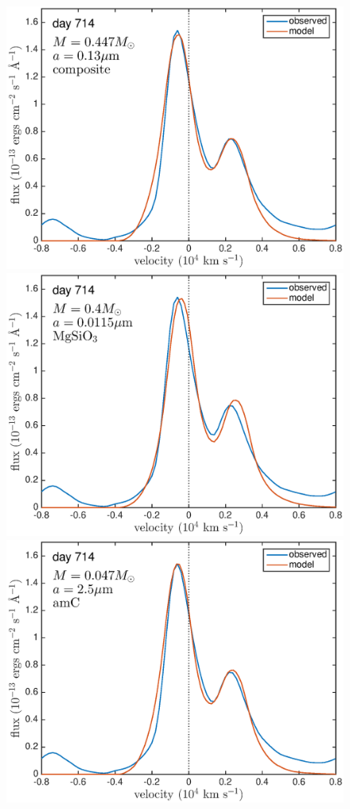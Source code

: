 \documentclass[useAMS,usenatbib,usegraphicx]{mnras}
\begin{document}
\begin{figure}
\includegraphics[trim =0 0 0 0,clip=true,scale=0.25]{silicates_take2/OI/composit_Dwek}
\includegraphics[trim =25 0 0 0,clip=true,scale=0.25]{silicates_take2/OI/MgSiO3_Dwek}
\includegraphics[trim =25 0 0 0,clip=true,scale=0.25]{silicates_take2/OI/AmC_Dwek}

\end{figure}
\end{document}
